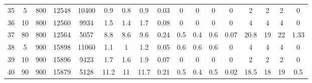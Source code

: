 \documentclass[11pt]{article}
\begin{document}
\begin{appendices}
\begin{landscape}
\begin{longtable}[c]{ccccc|cccc|cccc|cccc}
				35 & 5 & 800 & 12548 & 10400 & 0.9 & 0.8 & 0.9 & 0.03 & 0 & 0 & 0 & 0 & 2 & 2 & 2 & 0 \\
				36 & 10 & 800 & 12560 & 9934 & 1.5 & 1.4 & 1.7 & 0.08 & 0 & 0 & 0 & 0 & 4 & 4 & 4 & 0 \\
				37 & 80 & 800 & 12564 & 5057 & 8.8 & 8.6 & 9.6 & 0.24 & 0.5 & 0.4 & 0.6 & 0.07 & 20.8 & 19 & 22 & 1.33 \\
				\rowcolor[HTML]{EFEFEF} 
				38 & 5 & 900 & 15898 & 11060 & 1.1 & 1 & 1.2 & 0.05 & 0.6 & 0.6 & 0.6 & 0 & 4 & 4 & 4 & 0 \\
				\rowcolor[HTML]{EFEFEF} 
				39 & 10 & 900 & 15896 & 9423 & 1.7 & 1.6 & 1.9 & 0.07 & 0 & 0 & 0 & 0 & 2 & 2 & 2 & 0 \\
				\rowcolor[HTML]{EFEFEF} 
				40 & 90 & 900 & 15879 & 5128 & 11.2 & 11 & 11.7 & 0.21 & 0.5 & 0.4 & 0.5 & 0.02 & 18.5 & 18 & 19 & 0.5
			\end{longtable}
		\end{landscape}
		

\end{appendices}
\end{document}
